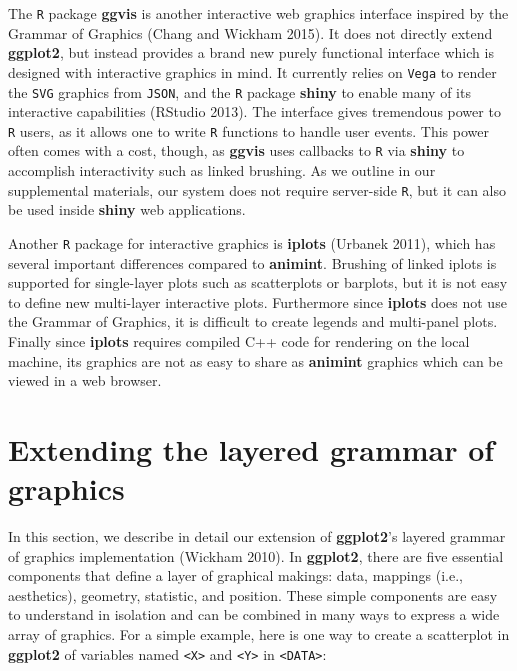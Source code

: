 \documentclass[12pt,]{article}
\theoremstyle{definition}
\theoremstyle{definition}
\theoremstyle{definition}
\theoremstyle{remark}
\begin{document}
The \texttt{R} package \textbf{ggvis} is another interactive web
graphics interface inspired by the Grammar of Graphics (Chang and
Wickham 2015). It does not directly extend \textbf{ggplot2}, but instead
provides a brand new purely functional interface which is designed with
interactive graphics in mind. It currently relies on \texttt{Vega} to
render the \texttt{SVG} graphics from \texttt{JSON}, and the \texttt{R}
package \textbf{shiny} to enable many of its interactive capabilities
(RStudio 2013). The interface gives tremendous power to \texttt{R}
users, as it allows one to write \texttt{R} functions to handle user
events. This power often comes with a cost, though, as \textbf{ggvis}
uses callbacks to \texttt{R} via \textbf{shiny} to accomplish
interactivity such as linked brushing. As we outline in our supplemental
materials, our system does not require server-side \texttt{R}, but it
can also be used inside \textbf{shiny} web applications.

Another \texttt{R} package for interactive graphics is \textbf{iplots}
(Urbanek 2011), which has several important differences compared to
\textbf{animint}. Brushing of linked iplots is supported for
single-layer plots such as scatterplots or barplots, but it is not easy
to define new multi-layer interactive plots. Furthermore since
\textbf{iplots} does not use the Grammar of Graphics, it is difficult to
create legends and multi-panel plots. Finally since \textbf{iplots}
requires compiled C++ code for rendering on the local machine, its
graphics are not as easy to share as \textbf{animint} graphics which can
be viewed in a web browser.

\hypertarget{extending-the-layered-grammar-of-graphics}{%
\section{Extending the layered grammar of
graphics}\label{extending-the-layered-grammar-of-graphics}}

In this section, we describe in detail our extension of
\textbf{ggplot2}'s layered grammar of graphics implementation (Wickham
2010). In \textbf{ggplot2}, there are five essential components that
define a layer of graphical makings: data, mappings (i.e., aesthetics),
geometry, statistic, and position. These simple components are easy to
understand in isolation and can be combined in many ways to express a
wide array of graphics. For a simple example, here is one way to create
a scatterplot in \textbf{ggplot2} of variables named
\texttt{\textless{}X\textgreater{}} and
\texttt{\textless{}Y\textgreater{}} in
\texttt{\textless{}DATA\textgreater{}}:
\end{document}
